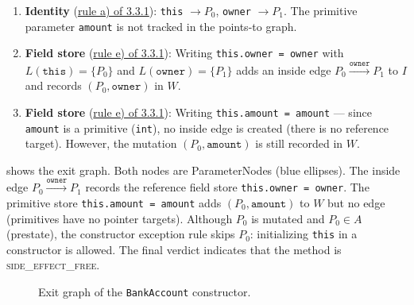 \begin{enumerate}
\item \textbf{Identity} (\hyperref[agl4a]{rule a) of 3.3.1}): \texttt{this} $\to P_0$, \texttt{owner} $\to P_1$. The primitive parameter \texttt{amount} is not tracked in the points-to graph.

\item \textbf{Field store} (\hyperref[agl4e]{rule e) of 3.3.1}): Writing \texttt{this.owner = owner} with $L(\texttt{this}) = \{P_0\}$ and $L(\texttt{owner}) = \{P_1\}$ adds an inside edge $P_0 \xrightarrow{\texttt{owner}} P_1$ to $I$ and records $(P_0, \texttt{owner})$ in $W$.

\item \textbf{Field store} (\hyperref[agl4e]{rule e) of 3.3.1}): Writing \texttt{this.amount = amount} --- since \texttt{amount} is a primitive (\texttt{int}), no inside edge is created (there is no reference target). However, the mutation $(P_0, \texttt{amount})$ is still recorded in $W$.
\end{enumerate}

\noindent
{} shows the exit graph. Both nodes are ParameterNodes (blue ellipses). The inside edge $P_0 \xrightarrow{\texttt{owner}} P_1$ records the reference field store \texttt{this.owner = owner}. The primitive store \texttt{this.amount = amount} adds $(P_0, \texttt{amount})$ to $W$ but no edge (primitives have no pointer targets). Although $P_0$ is mutated and $P_0 \in A$ (prestate), the constructor exception rule skips $P_0$: initializing \texttt{this} in a constructor is allowed.
  The final verdict indicates that the method is \textsc{side\_effect\_free}.

\begin{figure}[h]
\centering
{}
\caption{Exit graph of the \texttt{BankAccount} constructor.}
\label{fig:ctor-exit}
\end{figure}

